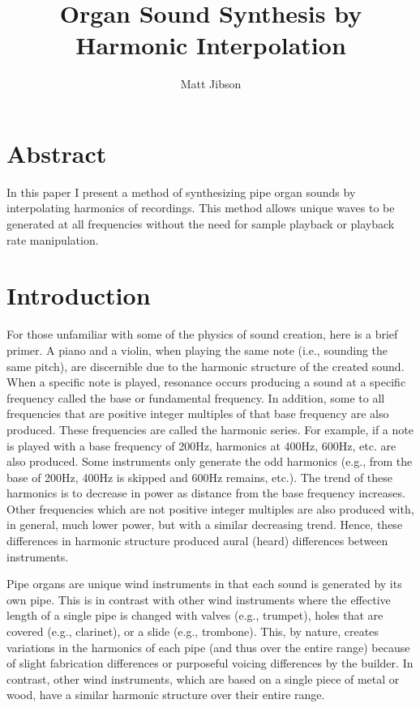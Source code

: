 \documentclass{article}
\begin{document}
\title{Organ Sound Synthesis by Harmonic Interpolation}
\author{Matt Jibson}

\maketitle{}

\section*{Abstract}

In this paper I present a method of synthesizing pipe organ sounds by interpolating harmonics of recordings. This method allows unique waves to be generated at all frequencies without the need for sample playback or playback rate manipulation.

\section{Introduction}

For those unfamiliar with some of the physics of sound creation, here is a brief primer. A piano and a violin, when playing the same note (i.e., sounding the same pitch), are discernible due to the harmonic structure of the created sound. When a specific note is played, resonance occurs producing a sound at a specific frequency called the base or fundamental frequency. In addition, some to all frequencies that are positive integer multiples of that base frequency are also produced. These frequencies are called the harmonic series. For example, if a note is played with a base frequency of 200Hz, harmonics at 400Hz, 600Hz, etc. are also produced. Some instruments only generate the odd harmonics (e.g., from the base of 200Hz, 400Hz is skipped and 600Hz remains, etc.). The trend of these harmonics is to decrease in power as distance from the base frequency increases. Other frequencies which are not positive integer multiples are also produced with, in general, much lower power, but with a similar decreasing trend. Hence, these differences in harmonic structure produced aural (heard) differences between instruments.

Pipe organs are unique wind instruments in that each sound is generated by its own pipe. This is in contrast with other wind instruments where the effective length of a single pipe is changed with valves (e.g., trumpet), holes that are covered (e.g., clarinet), or a slide (e.g., trombone). This, by nature, creates variations in the harmonics of each pipe (and thus over the entire range) because of slight fabrication differences or purposeful voicing differences by the builder. In contrast, other wind instruments, which are based on a single piece of metal or wood, have a similar harmonic structure over their entire range.
\end{document}
